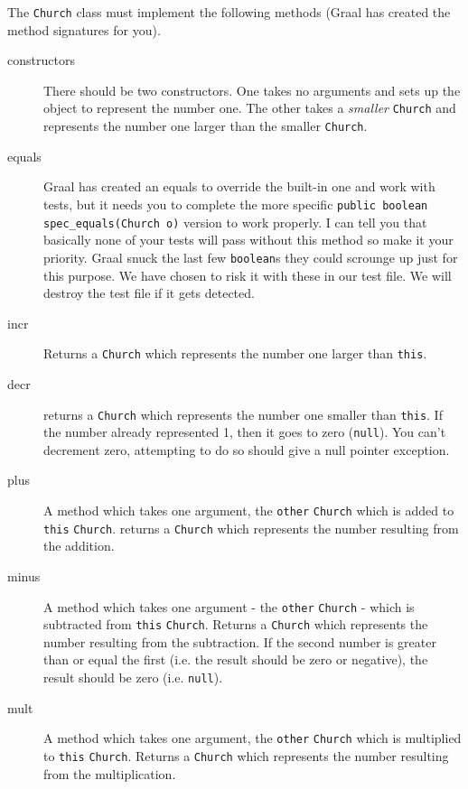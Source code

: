 \documentclass[twoside=false,DIV=14]{scrartcl}
\begin{document}
The \lstinline{Church} class must implement the following methods (Graal has created the method signatures for you).
\begin{description}
\item [constructors] There should be two constructors.  One takes no arguments and sets up the object to represent the number one.  The other takes a \emph{smaller} \lstinline{Church} and represents the number one larger than the smaller \lstinline{Church}.
\item [equals] Graal has created an equals to override the built-in one and work with tests, but it needs you to complete the more specific \verb|public boolean spec_equals(Church o)| version to work properly.  I can tell you that basically none of your tests will pass without this method so make it your priority.  Graal snuck the last few \verb+boolean+s they could scrounge up just for this purpose.  We have chosen to risk it with these in our test file.  We will destroy the test file if it gets detected.
\item [incr] Returns a \verb|Church| which represents the number one larger than \verb|this|.
\item [decr]  returns a \verb|Church| which represents the number one smaller than \verb|this|.  If the number already represented 1, then it goes to zero (\verb+null+).  You can't decrement zero,  attempting to do so should give a null pointer exception.
\item [plus] A method which takes one argument, the \lstinline{other} \lstinline{Church} which is added to \lstinline{this} \lstinline{Church}. returns a \verb|Church| which represents the number resulting from the addition.
\item [minus] A method which takes one argument - the \lstinline{other} \lstinline{Church} - which is subtracted from \lstinline{this} \lstinline{Church}. Returns a \verb|Church| which represents the number resulting from the subtraction.  If the second number is greater than or equal the first (i.e. the result should be zero or negative), the result should be zero (i.e. \verb+null+).
\item [mult]A method which takes one argument, the \lstinline{other} \lstinline{Church} which is multiplied to \lstinline{this} \lstinline{Church}. Returns a \verb|Church| which represents the number resulting from the multiplication.
\end{description}
\end{document}
